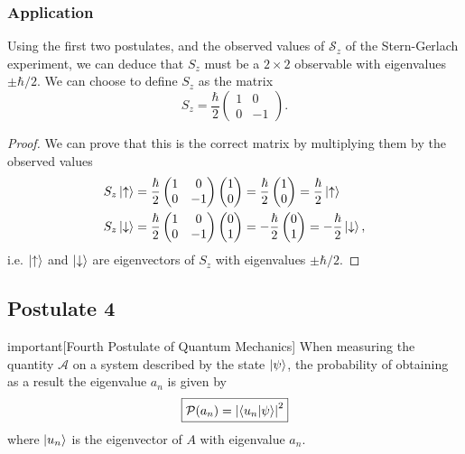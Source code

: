 \documentclass{article}
\begin{document}
\subsubsection{Application}
Using the first two postulates, and the observed values of $\mathcal{S}_z$ of the Stern-Gerlach experiment, we can deduce that $S_z$ must be a $2\times 2$ observable with eigenvalues $\pm\hbar /2$. We can choose to define $S_z$ as the matrix
\[
    S_z=\frac{\hbar }{2}\begin{pmatrix}
        1 & 0 \\ 0 & -1
    \end{pmatrix}.
\]
\begin{proof}
    We can prove that this is the correct matrix by multiplying them by the observed values
    \begin{align*}
        S_z \ket{\uparrow} &= \frac{\hbar }{2}\begin{pmatrix}
            1 & 0 \\ 0 & -1
        \end{pmatrix}\begin{pmatrix}
            1 \\ 0
        \end{pmatrix}=\frac{\hbar }{2}\begin{pmatrix}
            1 \\ 0
        \end{pmatrix}=\frac{\hbar }{2}\ket{\uparrow} \\
        S_z \ket{\downarrow}&=\frac{\hbar }{2}\begin{pmatrix}
            1 & 0 \\ 0 & -1
        \end{pmatrix}\begin{pmatrix}
            0 \\ 1
        \end{pmatrix}=-\frac{\hbar }{2}\begin{pmatrix}
            0 \\ 1
        \end{pmatrix}=-\frac{\hbar }{2}\ket{\downarrow},
    \end{align*}
    i.e. $\ket{\uparrow}$ and $\ket{\downarrow}$ are eigenvectors of $S_z$ with eigenvalues $\pm\hbar /2$.
\end{proof}

\subsection{Postulate 4}
\begin{callout*}{important}[Fourth Postulate of Quantum Mechanics]
\label{important:s3-p4}
When measuring the quantity $\mathcal{A}$ on a system described by the state $\ket{\psi }$, the probability of obtaining as a result the eigenvalue $a_n$ is given by
\[
    \boxed{\mathcal{P}(a_n)=\left| \braket{u_n}{\psi } \right|^2}
\]
where $\ket{u_n}$ is the eigenvector of $A$ with eigenvalue $a_n$.
\end{callout*}
\end{document}
